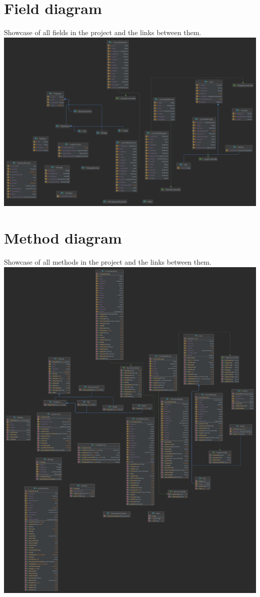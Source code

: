 \documentclass[
]{report}
\begin{document}
\hypertarget{field-diagram}{%
\section{Field diagram}\label{field-diagram}}

Showcase of all fields in the project and the links between them.
\includegraphics{diagrams/fieldDiagram.png}

\hypertarget{method-diagram}{%
\section{Method diagram}\label{method-diagram}}

Showcase of all methods in the project and the links between them.
\includegraphics{diagrams/methodDiagram.png}
\end{document}
